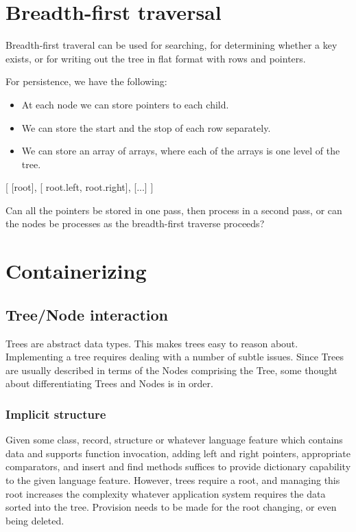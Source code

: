 \documentclass{article}
\begin{document}
\section{Breadth-first traversal}

Breadth-first traveral can be used for searching, for determining whether a key exists,
or for writing out the tree in flat format with rows and pointers.

For persistence, we have the following:

\begin{itemize}
\item At each node we can store pointers to each child.
\item We can store the start and the stop of each row separately.
\item We can store an array of arrays, where each of the arrays is
      one level of the tree.
\end{itemize}

[
 [root],
 [ root.left, root.right],
 [...]
]

Can all the pointers be stored in one pass, then process in a second pass,
or can the nodes be processes as the breadth-first traverse proceeds?


\section{Containerizing}

\subsection{Tree/Node interaction}

Trees are abstract data types. This makes trees easy to reason about.
Implementing a tree requires dealing with a number of subtle issues.
Since Trees are usually described in terms of the Nodes comprising
the Tree, some thought about differentiating Trees and Nodes is in order.

\subsubsection{Implicit structure}

Given some class, record, structure or whatever language feature which contains
data and supports function invocation, adding left and right pointers,
appropriate comparators, and insert and find methods suffices to provide
dictionary capability to the given language feature. However, trees require a
root, and managing this root increases the complexity whatever application
system requires the data sorted into the tree. Provision needs to be made for
the root changing, or even being deleted.
\end{document}
